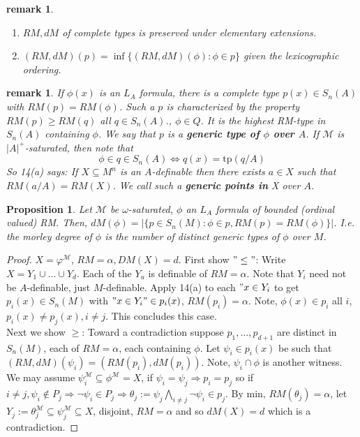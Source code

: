 \documentclass[letterpaper, 12pt]{article}
\newcommand{\fin}{\qquad \quad \hfill \framebox[1.75mm][l]{\,}}
\newcommand{\cM}{\mathcal{M}}
\newcommand{\tp}{\mbox{tp}}
\theoremstyle{stdthm}
\newtheorem{prop}[thm]{Proposition}
\theoremstyle{stddef}
\newtheorem{rem}[thm]{remark} %
\theoremstyle{stdnonum}
\theoremstyle{stdqands}
\theoremstyle{stdbold}
\begin{document}
\begin{rem}
\begin{enumerate}
\item $RM,dM$ of complete types is preserved under elementary extensions. 
\item $(RM,dM)(p) = \inf \{(RM,dM) (\phi): \phi \in p \}$ given the lexicographic ordering. 
\end{enumerate}

\end{rem}





\begin{rem}
If $\phi(x)$ is an $L_A$ formula, there is a complete type $p(x) \in S_n(A)$
with $RM(p) = RM(\phi)$. Such a $p$ is characterized by the property $RM(p) \geq RM(q)$ all $q \in S_n(A)$., $\phi \in Q$. It is the highest RM-type in $S_n(A)$ containing $\phi$.  We say that $p$ is a {\bf generic type of $\phi$ over $A$}. If $\cM$ is $|A|^+$-saturated, then note that 
\[ \phi \in q \in S_n(A) \iff q(x) = \tp(q/A) \]
So 14(a) says: If $X \subseteq M^n$ is an $A$-definable then there exists $a \in X$ such that $RM(a/A) = RM(X)$. We call such a {\bf generic points in }X over $A$. 
\end{rem}


\begin{prop}
Let $\cM$ be $\omega$-saturated, $\phi$ an $L_A$ formula of bounded (ordinal valued) RM. Then, $dM(\phi) = |\{ p \in S_n(M): \phi \in p, RM(p) = RM(\phi)\}|$. I.e. the morley degree of $\phi$ is the number of distinct generic types of $\phi$ over $M$. 
\end{prop}

\begin{proof}
$X = \varphi^\cM$, $RM = \alpha, DM(X) = d$.  First show $"\leq"$: Write $X = Y_1\cup \dots \cup Y_d$. Each of the $Y_u$ is definable of $RM = \alpha$. Note that $Y_i$ need not be $A$-definable, just $M$-definable.  Apply 14(a) to each $"x \in Y_i$ to get $p_i(x) \in S_n(M)$ with $"x \in Y_i" \in p_i(x)$, $RM(p_i) = \alpha$. Note, $\phi(x) \in p_i$ all $i$, $p_i(x) \neq p_j(x), i\neq j$. This concludes this case. \\

Next we show $\geq$: Toward a contradiction suppose $p_1,\dots, p_{d+1}$ are distinct in $S_n(M)$, each of $RM = \alpha$, each containing $\phi$. Let $\psi_i \in p_i(x)$ be such that $(RM, dM) (\psi_i) = (RM(p_i), dM(p_i))$. Note, $\psi_i \cap \phi$ is another witness. We may assume $\psi_i^\cM \subseteq \phi^\cM = X$, if $\psi_i = \psi_j \Rightarrow p_i = p_j$ so if $i\neq j, \psi_i \notin P_j \Rightarrow \neg \psi_i \in P_j \Rightarrow \theta_j := \psi_j \bigwedge_{i\neq j} \neg \psi_i \in p_j$. By min, $RM(\theta_j) = \alpha$, let $Y_j:= \theta_j^\cM \subseteq \psi_j^\cM \subseteq X$, disjoint, $RM = \alpha$ and so $dM(X) = d$ which is a contradiction.  
\end{proof}
\end{document}
